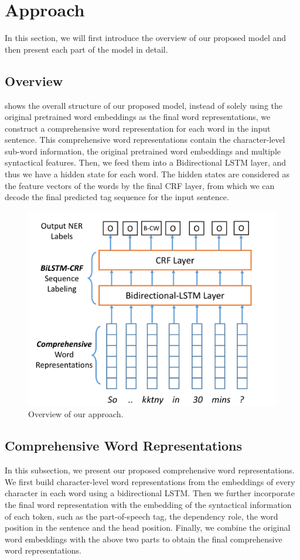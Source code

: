 \section{Approach}
\label{sec:approach}
In this section, we will first introduce the overview of our proposed model and then present each part of the model in detail.
 
\subsection{Overview}
 shows the overall structure of our proposed model, 
instead of solely using the original pretrained word embeddings as the final word representations, 
we construct a comprehensive word representation for each word in the input sentence.
This comprehensive word representations contain the character-level sub-word information, the original pretrained word embeddings and multiple syntactical features. 
Then, we feed them into a Bidirectional LSTM layer, and thus we have a hidden state for each word. 
The hidden states are considered as the feature vectors of the words by the final CRF layer, from which we can decode the final predicted tag sequence for the input sentence.
\begin{figure}[th!]
	\includegraphics[width=\columnwidth]{figures/overview}
	\caption{Overview of our approach.}
	\label{fig:overall}
\end{figure}
 
\subsection{Comprehensive Word Representations}
In this subsection, we present our proposed comprehensive word representations. 
We first build character-level word representations from the embeddings of every character in each word using a bidirectional LSTM. 
Then we further incorporate the final word representation with the embedding of the syntactical information of each token, such as the part-of-speech tag, the dependency role, the word position in the sentence and the head position. 
Finally, we combine the original word embeddings with the above two parts to obtain the final comprehensive word representations.

